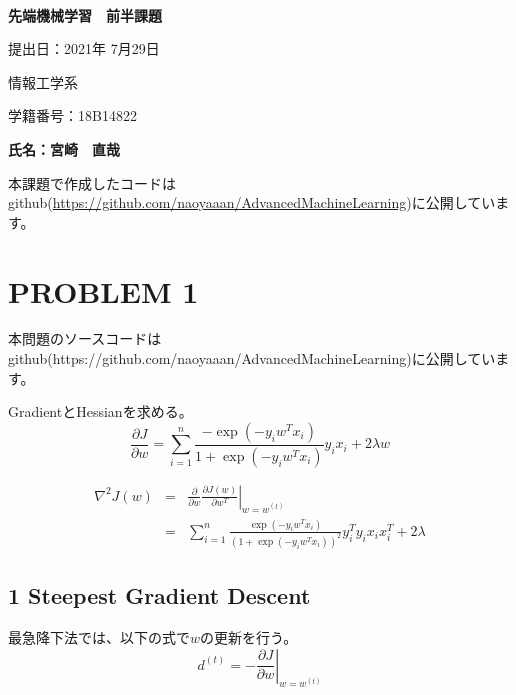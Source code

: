 \documentclass[a4j,11pt]{jarticle}
\begin{document}
\begin{center}
　\vspace{10mm}

{\bf {\huge 先端機械学習　前半課題}}

\vspace{80mm}

提出日：2021年 7月29日

\vspace{10mm}

情報工学系

\vspace{10mm}

学籍番号：18B14822

\vspace{10mm}


\vspace{20mm}

{\bf {\LARGE 氏名：宮崎　直哉}}
\end{center}





\newpage



本課題で作成したコードはgithub(\url{https://github.com/naoyaaan/AdvancedMachineLearning})に公開しています。

\section{PROBLEM 1}
本問題のソースコードはgithub(https://github.com/naoyaaan/AdvancedMachineLearning)に公開しています。

GradientとHessianを求める。
\begin{equation}
    \frac{\partial{J}}{\partial{w}} = \sum_{i=1}^{n} \frac{-\exp(-y_iw^{T}x_i)}{1 + \exp(-y_iw^{T}x_i)}y_{i}x_{i} + 2\lambda w
\end{equation}

\begin{eqnarray}
    \nabla^2 J(w) &=& \frac{\partial}{\partial w} \left.\frac{\partial J(w)}{\partial w^{T}}\right|_{w=w^{(t)}} \\
    &=& \sum_{i=1}^{n} \frac{\exp(-y_iw^{T}x_i)}{(1 + \exp(-y_iw^{T}x_i))^2}y^{T}_{i}y_{i}x_{i}x^{T}_{i} + 2\lambda
\end{eqnarray}

\subsection*{1 Steepest Gradient Descent}
最急降下法では、以下の式で$w$の更新を行う。
\begin{equation}
    d^{(t)} = -\left.\frac{\partial{J}}{\partial{w}}\right|_{w=w^{(t)}}
\end{equation}
\end{document}
